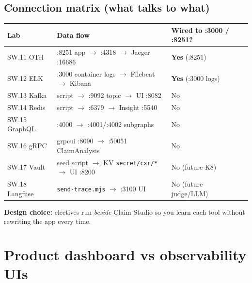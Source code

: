 \documentclass[11pt,a4paper]{report}
\begin{document}
\section{Connection matrix (what talks to what)}

\begin{center}
\small
\begin{tabular}{llll}
\toprule
Lab & Data flow & Wired to :3000 / :8251? \\
\midrule
SW.11 OTel & :8251 app $\rightarrow$ :4318 $\rightarrow$ Jaeger :16686 & \textbf{Yes} (:8251) \\
SW.12 ELK & :3000 container logs $\rightarrow$ Filebeat $\rightarrow$ Kibana & \textbf{Yes} (:3000 logs) \\
SW.13 Kafka & script $\rightarrow$ :9092 topic $\rightarrow$ UI :8082 & No \\
SW.14 Redis & script $\rightarrow$ :6379 $\rightarrow$ Insight :5540 & No \\
SW.15 GraphQL & :4000 $\rightarrow$ :4001/:4002 subgraphs & No \\
SW.16 gRPC & grpcui :8090 $\rightarrow$ :50051 ClaimAnalysis & No \\
SW.17 Vault & seed script $\rightarrow$ KV \texttt{secret/cxr/*} $\rightarrow$ UI :8200 & No (future K8) \\
SW.18 Langfuse & \texttt{send-trace.mjs} $\rightarrow$ :3100 UI & No (future judge/LLM) \\
\bottomrule
\end{tabular}
\end{center}

\textbf{Design choice:} electives run \emph{beside} Claim Studio so you learn each tool without rewriting the app every time.

\chapter{Product dashboard vs observability UIs}
\end{document}
